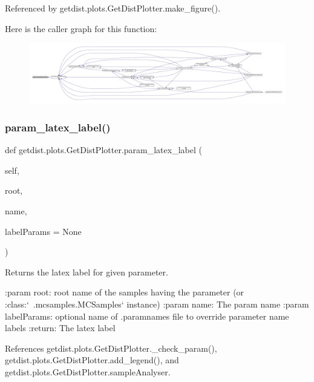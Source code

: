 Referenced by getdist.\+plots.\+Get\+Dist\+Plotter.\+make\+\_\+figure().

Here is the caller graph for this function\+:
\nopagebreak
\begin{figure}[H]
\begin{center}
\leavevmode
\includegraphics[width=350pt]{classgetdist_1_1plots_1_1GetDistPlotter_a844cb0d8b1f652daf9b23267a470636c_icgraph}
\end{center}
\end{figure}
\mbox{\label{classgetdist_1_1plots_1_1GetDistPlotter_a9f6d27f2345ccb87720770ddb81258d5}} 
\subsubsection{\texorpdfstring{param\+\_\+latex\+\_\+label()}{param\_latex\_label()}}
{\footnotesize\ttfamily def getdist.\+plots.\+Get\+Dist\+Plotter.\+param\+\_\+latex\+\_\+label (\begin{DoxyParamCaption}\item[{}]{self,  }\item[{}]{root,  }\item[{}]{name,  }\item[{}]{label\+Params = {\ttfamily None} }\end{DoxyParamCaption})}

\begin{DoxyVerb}Returns the latex label for given parameter.

:param root: root name of the samples having the parameter (or :class:`~.mcsamples.MCSamples` instance)
:param name:  The param name
:param labelParams: optional name of .paramnames file to override parameter name labels
:return: The latex label
\end{DoxyVerb}
 

References getdist.\+plots.\+Get\+Dist\+Plotter.\+\_\+check\+\_\+param(), getdist.\+plots.\+Get\+Dist\+Plotter.\+add\+\_\+legend(), and getdist.\+plots.\+Get\+Dist\+Plotter.\+sample\+Analyser.

